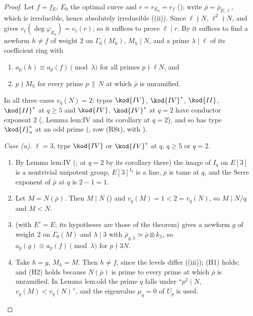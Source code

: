\begin{proof}
Let $f=f_E$, $E_0$ the optimal curve and $r=r_{E_0}=r_f$ (); write $\bar\rho=\bar\rho_{E,\ell}$, which is irreducible, hence absolutely irreducible
((ii)). Since $\ell\nmid N$, $\ell^2\nmid N$, and  gives $v_\ell(\deg\varphi_{E_0})=v_\ell(r)$; so it suffices to prove $\ell\mid r$. By
 it suffices to find a newform $h\ne f$ of weight $2$ on $\Gamma_0(M_h)$, $M_h\mid N$, and a prime $\lambda\mid\ell$ of its coefficient ring with
\begin{enumerate}[label=(H\arabic*)]
\item $a_p(h)\equiv a_p(f)\pmod\lambda$ for all primes $p\nmid\ell N$, and
\item $p\nmid M_h$ for every prime $p\,\|\,N$ at which $\bar\rho$ is unramified.
\end{enumerate}
In all three cases $v_q(N)=2$: types $\kod{IV}$, $\kod{IV}^*$, $\kod{II}$, $\kod{II}^*$ at $q\ge5$ and $\kod{IV}$, $\kod{IV}^*$ at $q=2$ have conductor exponent $2$ (, Lemma lem:IV
and its corollary at $q=2$), and so has type $\kod{I}_n^*$ at an odd prime (, row (RSt), with ).

\emph{Case (a).} $\ell=3$, type $\kod{IV}$ or $\kod{IV}^*$ at $q$, $q\ge5$ or $q=2$.
\begin{enumerate}[label=(a\arabic*)]
\item By Lemma lem:IV (; at $q=2$ by its corollary there) the image of $I_q$ on $E[3]$ is a nontrivial unipotent group, $E[3]^{I_q}$ is a line, $\bar\rho$ is
tame at $q$, and the Serre exponent of $\bar\rho$ at $q$ is $2-1=1$.
\item Let $M=N(\bar\rho)$. Then $M\mid N$ () and $v_q(M)=1<2=v_q(N)$, so $M\mid N/q$ and $M<N$.
\item {} (with $E'=E$; its hypotheses are those of the theorem) gives a newform $g$ of weight $2$ on $\Gamma_0(M)$ and $\lambda\mid3$ with
$\bar\rho_{g,\lambda}\simeq\bar\rho\otimes k_\lambda$, so $a_p(g)\equiv a_p(f)\pmod\lambda$ for $p\nmid3N$.
\item Take $h=g$, $M_h=M$. Then $h\ne f$, since the levels differ ((iii)); (H1) holds; and (H2) holds because $N(\bar\rho)$ is prime to every prime at
which $\bar\rho$ is unramified. In Lemma lem:old the prime $q$ falls under ``$p^2\mid N$, $v_q(M)<v_q(N)$'', and the eigenvalue $\mu_q=0$ of $U_q$ is used.
\end{enumerate}


\end{proof}
